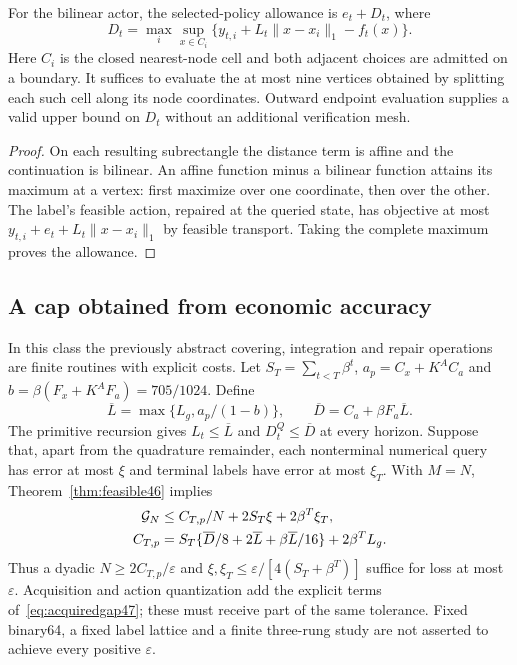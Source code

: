 \begin{lemma}\label{lem:corners47}
For the bilinear actor, the selected-policy allowance is $e_t+D_t$, where
\[
 D_t=\max_i\sup_{x\in C_i}
       \{y_{t,i}+L_t\|x-x_i\|_1-f_t(x)\}.
\]
Here $C_i$ is the closed nearest-node cell and both adjacent choices are admitted on a boundary. It suffices to evaluate the at most nine vertices obtained by splitting each such cell along its node coordinates. Outward endpoint evaluation supplies a valid upper bound on $D_t$ without an additional verification mesh.
\end{lemma}
\begin{proof}
On each resulting subrectangle the distance term is affine and the continuation is bilinear. An affine function minus a bilinear function attains its maximum at a vertex: first maximize over one coordinate, then over the other. The label's feasible action, repaired at the queried state, has objective at most $y_{t,i}+e_t+L_t\|x-x_i\|_1$ by feasible transport. Taking the complete maximum proves the allowance.
\end{proof}

\subsection{A cap obtained from economic accuracy}
In this class the previously abstract covering, integration and repair operations are finite routines with explicit costs. Let $S_T=\sum_{t<T}\beta^t$, $a_p=C_x+K^AC_a$ and $b=\beta(F_x+K^AF_a)=705/1024$. Define
\[
 \overline L=\max\{L_g,a_p/(1-b)\},\qquad
 \overline D=C_a+\beta F_a\overline L.
\]
The primitive recursion gives $L_t\le\overline L$ and $D_t^Q\le\overline D$ at every horizon. Suppose that, apart from the quadrature remainder, each nonterminal numerical query has error at most $\xi$ and terminal labels have error at most $\xi_T$. With $M=N$, Theorem~\ref{thm:feasible46} implies
\begin{align}\label{eq:explicitcap47}
 \mathcal G_N&\le C_{T,p}/N+2S_T\xi+2\beta^T\xi_T,\\
 C_{T,p}&=S_T\{\overline D/8+2\overline L+\beta\overline L/16\}
                     +2\beta^TL_g.\notag
\end{align}
Thus a dyadic $N\ge2C_{T,p}/\varepsilon$ and $\xi,\xi_T\le\varepsilon/[4(S_T+\beta^T)]$ suffice for loss at most $\varepsilon$. Acquisition and action quantization add the explicit terms of~\eqref{eq:acquiredgap47}; these must receive part of the same tolerance. Fixed binary64, a fixed label lattice and a finite three-rung study are not asserted to achieve every positive $\varepsilon$.

